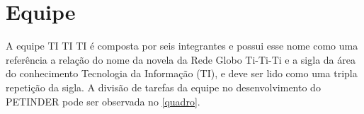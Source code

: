 \chapter{Equipe}
A equipe TI TI TI é composta por seis integrantes e possui esse nome como uma referência a relação do nome da novela da Rede Globo Ti-Ti-Ti e a sigla da área do conhecimento Tecnologia da Informação (TI), e deve ser lido como uma tripla repetição da sigla. A divisão de tarefas da equipe no desenvolvimento do PETINDER pode ser observada no \autoref{quadro}.


